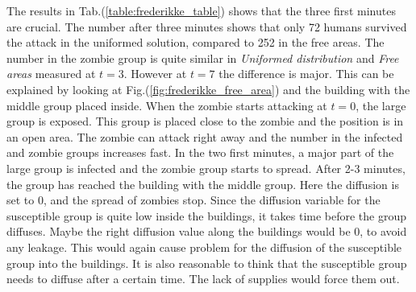 \documentclass[%
twoside,                 %
final,                   %
chapterprefix=true,      %
open=right               %
10pt]{book}
\begin{document}
The results in Tab.(\ref{table:frederikke_table}) shows that the three first minutes are crucial. The number after three minutes shows that only 72 humans survived the attack in the uniformed solution, compared to 252 in the free areas. The number in the zombie group is quite similar in \emph{Uniformed distribution} and \emph{Free areas} measured at $t=3$. However at $t=7$ the difference is major. This can be explained by looking at Fig.(\ref{fig:frederikke_free_area}) and the building with the middle group placed inside. When the zombie starts attacking at $t=0$, the large group is exposed. This group is placed close to the zombie and the position is in an open area. The zombie can attack right away and the number in the infected and zombie groups increases fast. In the two first minutes, a major part of the large group is infected and the zombie group starts to spread. After 2-3 minutes, the group has reached the building with the middle group. Here the diffusion is set to 0, and the spread of zombies stop. Since the diffusion variable for the susceptible group is quite low inside the buildings, it takes time before the group diffuses. Maybe the right diffusion value along the buildings would be 0, to avoid any leakage. This would again cause problem for the diffusion of the susceptible group into the buildings. It is also reasonable to think that the susceptible group needs to diffuse after a certain time. The lack of supplies would force them out.

\label{table:frederikke_table}
\end{document}
